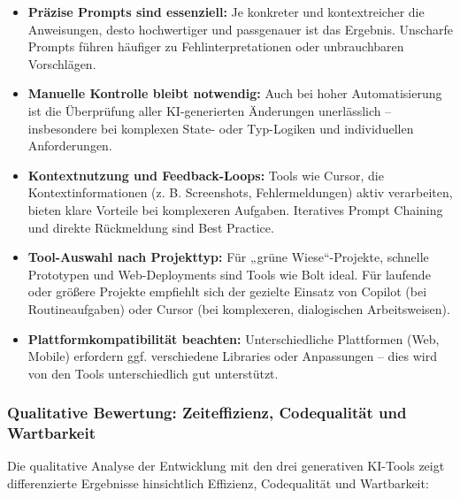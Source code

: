 \begin{itemize}
      \item \textbf{Präzise Prompts sind essenziell:} Je konkreter und kontextreicher die Anweisungen, desto hochwertiger und passgenauer ist das Ergebnis. Unscharfe Prompts führen häufiger zu Fehlinterpretationen oder unbrauchbaren Vorschlägen.
      \item \textbf{Manuelle Kontrolle bleibt notwendig:} Auch bei hoher Automatisierung ist die Überprüfung aller KI-generierten Änderungen unerlässlich – insbesondere bei komplexen State- oder Typ-Logiken und individuellen Anforderungen.
      \item \textbf{Kontextnutzung und Feedback-Loops:} Tools wie Cursor, die Kontextinformationen (z. B. Screenshots, Fehlermeldungen) aktiv verarbeiten, bieten klare Vorteile bei komplexeren Aufgaben. Iteratives Prompt Chaining und direkte Rückmeldung sind Best Practice.
      \item \textbf{Tool-Auswahl nach Projekttyp:} Für „grüne Wiese“-Projekte, schnelle Prototypen und Web-Deployments sind Tools wie Bolt ideal. Für laufende oder größere Projekte empfiehlt sich der gezielte Einsatz von Copilot (bei Routineaufgaben) oder Cursor (bei komplexeren, dialogischen Arbeitsweisen).
      \item \textbf{Plattformkompatibilität beachten:} Unterschiedliche Plattformen (Web, Mobile) erfordern ggf. verschiedene Libraries oder Anpassungen – dies wird von den Tools unterschiedlich gut unterstützt.
\end{itemize}

\subsubsection{Qualitative Bewertung: Zeiteffizienz, Codequalität und Wartbarkeit}

Die qualitative Analyse der Entwicklung mit den drei generativen KI-Tools zeigt
differenzierte Ergebnisse hinsichtlich Effizienz, Codequalität und Wartbarkeit:

